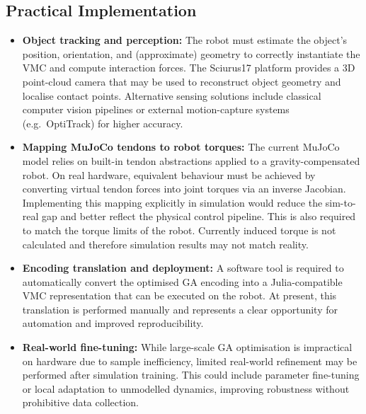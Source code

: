 \documentclass[12pt,a4paper,twocolumn]{article}
\begin{document}
\subsection{Practical Implementation}
\begin{itemize}
    \item \textbf{Object tracking and perception:}
    The robot must estimate the object’s position, orientation, and (approximate) geometry to correctly instantiate the VMC and compute interaction forces.
    The Sciurus17 platform provides a 3D point-cloud camera that may be used to reconstruct object geometry and localise contact points.
    Alternative sensing solutions include classical computer vision pipelines or external motion-capture systems (e.g.\ OptiTrack) for higher accuracy.

    \item \textbf{Mapping MuJoCo tendons to robot torques:}
    The current MuJoCo model relies on built-in tendon abstractions applied to a gravity-compensated robot.
    On real hardware, equivalent behaviour must be achieved by converting virtual tendon forces into joint torques via an inverse Jacobian.
    Implementing this mapping explicitly in simulation would reduce the sim-to-real gap and better reflect the physical control pipeline. This is also required to match the torque limits of the robot. Currently induced torque is not calculated and therefore simulation results may not match reality.

    \item \textbf{Encoding translation and deployment:}
    A software tool is required to automatically convert the optimised GA encoding into a Julia-compatible VMC representation that can be executed on the robot.
    At present, this translation is performed manually and represents a clear opportunity for automation and improved reproducibility.

    \item \textbf{Real-world fine-tuning:}
    While large-scale GA optimisation is impractical on hardware due to sample inefficiency, limited real-world refinement may be performed after simulation training.
    This could include parameter fine-tuning or local adaptation to unmodelled dynamics, improving robustness without prohibitive data collection.

\end{itemize}
\end{document}
